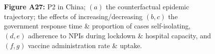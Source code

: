 \documentclass[paper=a4,fontsize=11pt]{article}
\begin{document}
\begin{figure}[!h]
  \\
  \hspace{1.76cm}
  \\
  \caption*{\textbf{Figure A27:} P2 in China; $(a)$ the counterfactual epidemic trajectory; the effects of increasing/decreasing $(b,c)$ the government response time \& proportion of cases self-isolating, $(d,e)$ adherence to NPIs during lockdown \& hospital capacity, and $(f,g)$ vaccine administration rate \& uptake.}
\end{figure}
\end{document}
